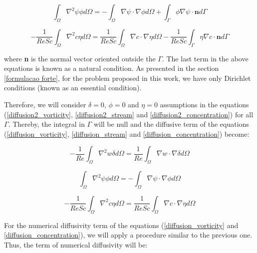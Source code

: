 \begin{equation} \label{diffusion2_stream} 
 \int_{\Omega} \nabla^2 \psi \phi d\Omega
 = - \int_{\Omega} \nabla \psi \cdot \nabla \phi d\Omega
   + \int_{\Gamma} \phi \nabla \psi \cdot \textbf{n} d\Gamma
\end{equation}

\begin{equation} \label{diffusion2_concentration} 
 - \frac{1}{\textit{ReSc}} \int_{\Omega} \nabla^2 c \eta d\Omega
 = \frac{1}{\textit{ReSc}} \int_{\Omega} \nabla c \cdot \nabla \eta d\Omega
 - \frac{1}{\textit{ReSc}} \int_{\Gamma} \eta \nabla c \cdot \textbf{n} d\Gamma
\end{equation}

\noindent
where \textbf{n} is the normal vector oriented outside the $\Gamma$. 
The last term in the above equations is known as a natural condition. 
As presented in the section \ref{formulacao forte}, 
for the problem proposed in this work, we have only Dirichlet conditions 
(known as an essential condition).

Therefore,
we will consider 
$\delta = 0$, $\phi = 0$ and $\eta = 0$ assumptions in the equations (\ref{diffusion2_vorticity}, \ref{diffusion2_stream} and \ref{diffusion2_concentration})
for all $\Gamma$. 
Thereby, 
the integral in $\Gamma$ will be null
and the diffusive term of the equations 
(\ref{diffusion_vorticity}, \ref{diffusion_stream} and \ref{diffusion_concentration}) become:

\begin{equation}
 - \frac{1}{\textit{Re}} \int_{\Omega} \nabla^2 w \delta d\Omega
 = \frac{1}{\textit{Re}} \int_{\Omega} \nabla w \cdot \nabla \delta d\Omega
\end{equation}

\begin{equation} 
 \int_{\Omega} \nabla^2 \psi \phi d\Omega
 = - \int_{\Omega} \nabla \psi \cdot \nabla \phi d\Omega
\end{equation}

\begin{equation} 
 - \frac{1}{\textit{ReSc}} \int_{\Omega} \nabla^2 c \eta d\Omega
 = \frac{1}{\textit{ReSc}} \int_{\Omega} \nabla c \cdot \nabla \eta d\Omega
\end{equation}

\medskip
For the numerical diffusivity term of the equations 
(\ref{diffusion_vorticity} and \ref{diffusion_concentration}), 
we will apply a procedure similar to the previous one. 
Thus, the term of numerical diffusivity will be:


